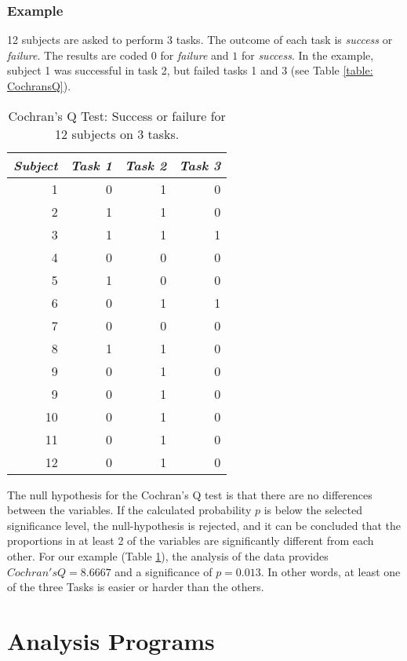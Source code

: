 \subsubsection{Example}

12 subjects are asked to perform 3 tasks. The outcome of each task is \emph{success} or \emph{failure}. The results are coded $0$ for \emph{failure} and $1$ for \emph{success}. In the example, subject 1 was successful in task 2, but failed tasks 1 and 3 (see Table \ref{table: CochransQ}).

\begin{table}
  \centering
  \begin{tabular}{|r|r r r|}
  \hline
  \emph{Subject}& \emph{Task 1} & \emph{Task 2} & \emph{Task 3} \\
  \hline
  1  & 0 & 1 & 0 \\
  2  & 1 & 1 & 0 \\
  3  & 1 & 1 & 1 \\
  4  & 0 & 0 & 0 \\
  5  & 1 & 0 & 0 \\
  6  & 0 & 1 & 1 \\
  7  & 0 & 0 & 0 \\
  8  & 1 & 1 & 0 \\
  9  & 0 & 1 & 0 \\
  9  & 0 & 1 & 0 \\
  10 & 0 & 1 & 0 \\
  11 & 0 & 1 & 0 \\
  12 & 0 & 1 & 0 \\
  \hline
  \end{tabular}

  \caption{Cochran's Q Test: Success or failure for 12 subjects on 3 tasks.}\label{table:CochransQ}
\end{table}

The null hypothesis for the Cochran's Q test is that there are no differences between the variables. If the calculated probability $p$ is below the selected significance level, the null-hypothesis is rejected, and it can be concluded that the proportions in at least 2 of the variables are significantly different from each other. For our example (Table \ref{table:CochransQ}), the analysis of the data provides $Cochran's Q = 8.6667$ and a significance of $p = 0.013$. In other words, at least one of the three Tasks is easier or harder than the others.

\section{Analysis Programs}

